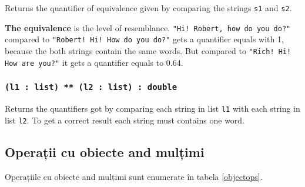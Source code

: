 Returns the quantifier of equivalence given by comparing the strings \texttt{s1} and \texttt{s2}.

{\bf The equivalence} is the level of resemblance. \texttt{"Hi! Robert, how do you do?"} compared to \texttt{"Robert! Hi! How do you do?"} gets a quantifier equals with 1, because the both strings contain the same words. But compared to \texttt{"Rich! Hi! How are you?"} it gets a quantifier equals to 0.64.

\subsubsection{\texttt{(l1 : list) ** (l2 : list) : double}}

Returns the quantifiers got by comparing each string in list \texttt{l1} with each string in list \texttt{l2}. To get a correct result each string must contains one word.

\subsection{Operații cu obiecte and mulțimi}

Operațiile cu obiecte and mulțimi sunt enumerate în tabela \ref{objectops}.

